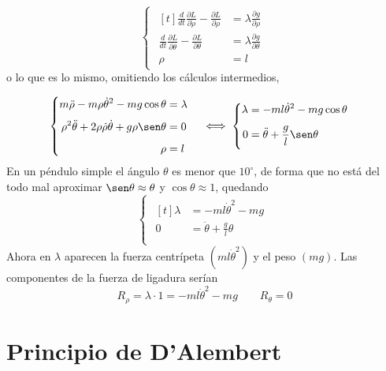 \documentclass[12pt]{report}
\begin{document}
\begin{example}
\[
\begin{cases}
\begin{aligned}[t]
\frac{d}{dt}\frac{\partial L}{\partial \dot{\rho}}-\frac{\partial L}{\partial \rho} &= \lambda \frac{\partial g}{\partial \rho} \\[5pt]
\frac{d}{dt}\frac{\partial L}{\partial \dot{\theta}}-\frac{\partial L}{\partial \theta} &= \lambda \frac{\partial g}{\partial \theta} \\[5pt]
\rho &= l
\end{aligned}
\end{cases}
\]
o lo que es lo mismo, omitiendo los cálculos intermedios,

\[
\begin{cases}
\begin{aligned}[t]
m\ddot{\rho}-m\rho\dot{\theta}^2-mg\cos\theta &=\lambda \\[5pt]
\rho^2\ddot{\theta}+2\rho\dot{\rho}{\dot{\theta}}+g\rho\sen\theta &= 0 \\[5pt]
\rho &= l
\end{aligned}
\end{cases} \iff
\begin{cases}
\begin{aligned}[t]
\lambda &= -ml\dot{\theta}^2-mg\cos\theta \\[5pt]
0 &= \ddot{\theta}+\frac{g}{l}\sen\theta \\[5pt]
\end{aligned}
\end{cases}
\]
En un péndulo simple el ángulo $\theta$ es menor que $10^\circ$, de forma que no está del todo mal aproximar $\sen \theta \approx \theta$ y $\cos \theta \approx 1$, quedando
\[
\begin{cases}
\begin{aligned}[t]
\lambda &= -ml\dot{\theta}^2-mg \\[5pt]
0 &=\ddot{\theta}+\frac{g}{l}\theta  \\[5pt]
\end{aligned}
\end{cases}
\]
Ahora en $\lambda$ aparecen la fuerza centrípeta $(ml\dot{\theta}^2)$ y el peso $(mg)$. Las componentes de la fuerza de ligadura serían
\[R_\rho = \lambda \cdot 1 = -ml\dot{\theta}^2-mg \qquad R_\theta = 0\]
\end{example}

\section{Principio de D'Alembert}
\end{document}
